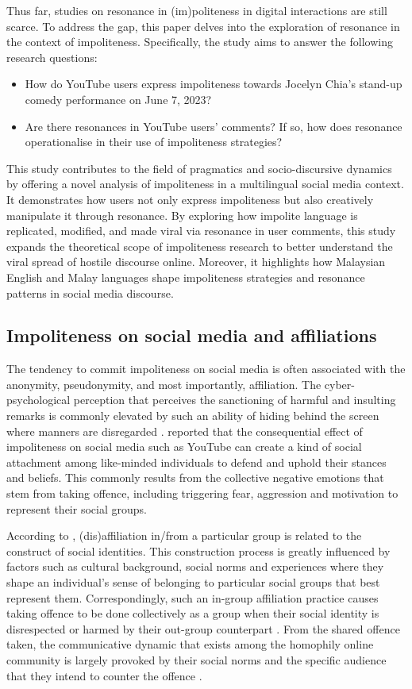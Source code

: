 \documentclass[english]{textolivre}
\begin{document}
Thus far, studies on resonance in (im)politeness in digital interactions are still scarce. To address the gap, this paper delves into the exploration of resonance in the context of impoliteness. Specifically, the study aims to answer the following research questions:
\begin{itemize}
    \item How do YouTube users express impoliteness towards Jocelyn Chia’s stand-up comedy performance on June 7, 2023?
    \item Are there resonances in YouTube users’ comments? If so, how does resonance operationalise in their use of impoliteness strategies?
\end{itemize}

This study contributes to the field of pragmatics and socio-discursive dynamics by offering a novel analysis of impoliteness in a multilingual social media context. It demonstrates how users not only express impoliteness but also creatively manipulate it through resonance. By exploring how impolite language is replicated, modified, and made viral via resonance in user comments, this study expands the theoretical scope of impoliteness research to better understand the viral spread of hostile discourse online. Moreover, it highlights how Malaysian English and Malay languages shape impoliteness strategies and resonance patterns in social media discourse. 

\subsection{Impoliteness on social media and affiliations}
The tendency to commit impoliteness on social media is often associated with the anonymity, pseudonymity, and most importantly, affiliation. The cyber-psychological perception that perceives the sanctioning of harmful and insulting remarks is commonly elevated by such an ability of hiding behind the screen where manners are disregarded \cite{brown2018, kapoor2022, sinkeviciute2018, tagg2017, yun2020}. \textcite{andersson2021} reported that the consequential effect of impoliteness on social media such as YouTube can create a kind of social attachment among like-minded individuals to defend and uphold their stances and beliefs. This commonly results from the collective negative emotions that stem from taking offence, including triggering fear, aggression and motivation to represent their social groups.

According to \textcite{garces2013}, (dis)affiliation in/from a particular group is related to the construct of social identities. This construction process is greatly influenced by factors such as cultural background, social norms and experiences where they shape an individual’s sense of belonging to particular social groups that best represent them. Correspondingly, such an in-group affiliation practice causes taking offence to be done collectively as a group when their social identity is disrespected or harmed by their out-group counterpart \cite{alias2019, andersson2021}. From the shared offence taken, the communicative dynamic that exists among the homophily online community is largely provoked by their social norms and the specific audience that they intend to counter the offence \cite{tagg2017}.
\end{document}
